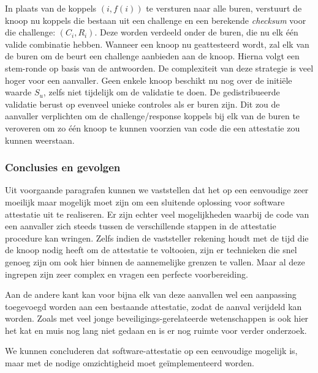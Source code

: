 In plaats van de koppels $(i, f(i))$ te versturen naar alle buren, verstuurt de
knoop nu koppels die bestaan uit een challenge en een berekende \emph{checksum}
voor die challenge: $(C_i,R_i)$. Deze worden verdeeld onder de buren, die nu
elk \'e\'en valide combinatie hebben. Wanneer een knoop nu geattesteerd wordt,
zal elk van de buren om de beurt een challenge aanbieden aan de knoop. Hierna
volgt een stem-ronde op basis van de antwoorden. De complexiteit van deze
strategie is veel hoger voor een aanvaller. Geen enkele knoop beschikt nu nog
over de initi\"ele waarde $S_u$, zelfs niet tijdelijk om de validatie te doen.
De gedistribueerde validatie berust op evenveel unieke controles als er buren
zijn. Dit zou de aanvaller verplichten om de challenge/response koppels bij elk
van de buren te veroveren om zo \'e\'en knoop te kunnen voorzien van code die
een attestatie zou kunnen weerstaan.

\subsubsection*{Conclusies en gevolgen}

Uit voorgaande paragrafen kunnen we vaststellen dat het op een eenvoudige \mcu
zeer moeilijk maar mogelijk moet zijn om een sluitende oplossing voor software
attestatie uit te realiseren. Er zijn echter veel mogelijkheden waarbij de code
van een aanvaller zich steeds tussen de verschillende stappen in de attestatie
procedure kan wringen. Zelfs indien de vaststeller rekening houdt met de tijd
die de knoop nodig heeft om de attestatie te voltooien, zijn er technieken die
snel genoeg zijn om ook hier binnen de aannemelijke grenzen te vallen. Maar al
deze ingrepen zijn zeer complex en vragen een perfecte voorbereiding.

Aan de andere kant kan voor bijna elk van deze aanvallen wel een aanpassing
toegevoegd worden aan een bestaande attestatie, zodat de aanval verijdeld kan
worden. Zoals met veel jonge beveiligings-gerelateerde wetenschappen is ook
hier het kat en muis nog lang niet gedaan en is er nog ruimte voor verder
onderzoek.

We kunnen concluderen dat software-attestatie op een eenvoudige \mcu mogelijk
is, maar met de nodige omzichtigheid moet ge\"implementeerd worden.
